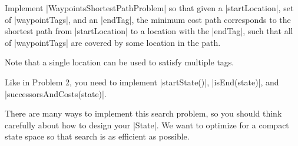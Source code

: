 \item {}

Implement |WaypointsShortestPathProblem| so that given a |startLocation|, set of |waypointTags|, and an |endTag|, the minimum cost path corresponds to the shortest path from |startLocation| to a location with the |endTag|, such that all of |waypointTags| are covered by some location in the path.

Note that a single location can be used to satisfy multiple tags.

Like in Problem 2, you need to implement |startState()|, |isEnd(state)|, and |successorsAndCosts(state)|.

There are many ways to implement this search problem, so you should think carefully about how to design your |State|. We want to optimize for a compact state space so that search is as efficient as possible.

